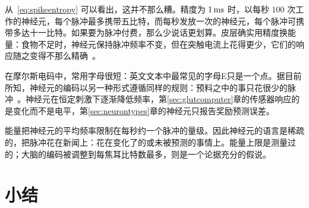 从~\eqref{eq:spikeentropy} 可以看出，这并不那么糟。精度为 $1\,\text{ms}$ 时，以每秒 $100$ 次工作的神经元，每个脉冲最多携带五比特，而每秒发放一次的神经元，每个脉冲可携带多达十一比特。如果要为脉冲付费，那么少说话更划算。皮层确实用精度换能量：食物不足时，神经元保持脉冲频率不变，但在突触电流上花得更少，它们的响应随之变得不那么精确~\cite{Padamsey2022}。

在摩尔斯电码中，常用字母很短：英文文本中最常见的字母E只是一个点。据目前所知，神经元的编码以另一种形式遵循同样的规则：预料之中的事只花很少的脉冲~\cite{Barlow1961}。神经元在恒定刺激下逐渐降低频率，第\ref{sec:glutcomputer}章的传感器响应的是变化而不是电平，第\ref{sec:neurontypes}章的神经元只报告奖励预测误差。

\begin{keyblock}
\begin{proposition}[节约]
\label{prop:economy}
能量把神经元的平均频率限制在每秒约一个脉冲的量级。因此神经元的语言是稀疏的，把脉冲花在新闻上：花在变化了的或未被预测的事情上。能量上限是测量过的；大脑的编码被调整到每焦耳比特数最多，则是一个论据充分的假说。
\end{proposition}
\end{keyblock}

\section{小结}

